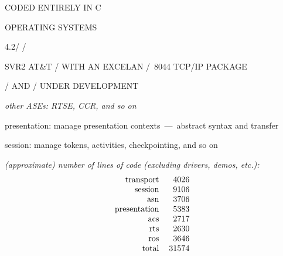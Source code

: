 \begin{bwslide}

\begin{nrtc}

\item	CODED ENTIRELY IN C

\item	OPERATING SYSTEMS
    \begin{nrtc}
    \item	4.2\bsd/ \unix/
    \item	SVR2 AT\&T \unix/ WITH AN EXCELAN \exos/~8044 TCP/IP PACKAGE
    \item	\vms/ AND \pcdos/ UNDER DEVELOPMENT
    \end{nrtc}
\end{nrtc}
\end{bwslide}




\begin{note}\em
other ASEs: RTSE, CCR, and so on

presentation: manage presentation contexts~---~abstract syntax and transfer

session: manage tokens, activities, checkpointing, and so on
\end{note}




\begin{note}\em
(approximate) number of lines of code (excluding drivers, demos, etc.):
\[\begin{tabular}{rr}
transport&	4026\\
session&	9106\\
asn&		3706\\
presentation&	5383\\
acs&		2717\\
rts&		2630\\
ros&		3646\\
total&		31574
\end{tabular}\]
\end{note}



